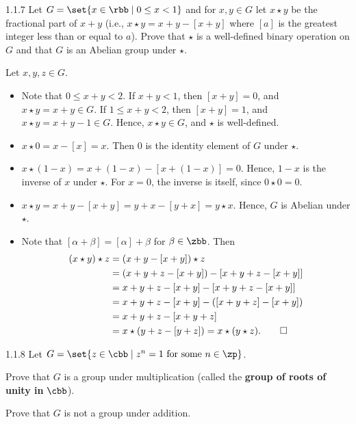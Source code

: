\begin{exercise}{1.1.7}
    Let $G = \set{ x \in \rbb \mid 0 \le x < 1 }$ and for $x, y \in G$ let $x \star y$ be the fractional part of $x + y$ (i.e., $x \star y = x + y - [x + y]$ where $[a]$ is the greatest integer less than or equal to $a$).
	Prove that $\star$ is a well-defined binary operation on $G$ and that $G$ is an Abelian group under $\star$.
\end{exercise}

\begin{sol}
    Let $x, y, z \in G$.
    \begin{itemize}
        \item Note that $0 \leq x + y < 2$.
	    If $x + y < 1$, then $[x + y] = 0$, and $x \star y = x + y \in G$.
	    If $1 \leq x + y < 2$, then $[x + y] = 1$, and $x \star y = x + y - 1 \in G$.
	    Hence, $x \star y \in G$, and $\star$ is well-defined.
        \item $x \star 0 = x - [x] = x$.
	    Then $0$ is the identity element of $G$ under $\star$.
        \item $x \star (1 - x) = x + (1 - x) - [x + (1 - x)] = 0$.
	    Hence, $1 - x$ is the inverse of $x$ under $\star$.
	    For $x = 0$, the inverse is itself, since $0 \star 0 = 0$.
        \item $x \star y = x + y - [x + y] = y + x - [y + x] = y \star x$.
	    Hence, $G$ is Abelian under $\star$.
        \item Note that $[\alpha + \beta] = [\alpha] + \beta$ for $\beta \in \zbb$.
	    Then
        \begin{align*}
            (x \star y) \star z & = (x + y - [x + y]) \star z \\
            & = (x + y + z - [x + y]) - [x + y + z - [x + y]] \\
            & = x + y + z - [x + y] - [x + y + z - [x + y]] \\
            & = x + y + z - [x + y] - ([x + y + z] - [x + y]) \\
            & = x + y + z - [x + y + z] \\
            & = x \star (y + z - [y + z]) = x \star (y \star z). \qedhere
        \end{align*}
    \end{itemize}
\end{sol}

\begin{exercise}{1.1.8}
    Let $G = \set{z \in \cbb\mid z^n = 1 \text{ for some } n \in \zp }$.
    \begin{subexercises}
        \item Prove that $G$ is a group under multiplication (called the \textbf{group of roots of unity in} $\cbb$).
        \item Prove that $G$ is not a group under addition.
    \end{subexercises}
\end{exercise}


